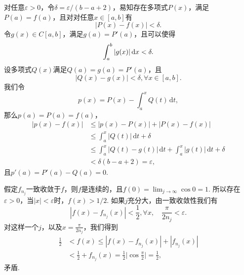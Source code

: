 \begin{ans}
  对任意$\varepsilon>0$，令$\delta=\varepsilon/(b-a+2)$，易知存在多项式$P(x)$，满足$P(a)=f(a)$，且对对任意$x\in[a,b]$有
  \[ |P(x)-f(x)|<\delta. \]
  令$g(x)\in C[a,b]$，满足$g(a)=P'(a)$，且可以使得
  \[ \int_a^b|g(x)|\,\mathrm dx<\delta. \]
  设多项式$Q(x)$满足$Q(a)=g(a)=P'(a)$，且
  \[ |Q(x)-g(x)|<\delta,\forall x\in[a,b]. \]
  我们令
  \[ p(x) = P(x) - \int_a^xQ(t)\,\mathrm dt, \]
  那么$p(a)=P(a)=f(a)$，
  \begin{align*}
    |p(x)-f(x)| & \le |p(x)-P(x)| + |P(x)-f(x)|\\
    & \le \int_a^x|Q(t)|\,\mathrm dt + \delta\\
    & \le \int_a^x|Q(t)-g(t)|\,\mathrm dt +
    \int_a^x|g(t)|\,\mathrm dt + \delta\\
    & < \delta(b-a+2) = \varepsilon,
  \end{align*}
  且$p'(a)=P'(a)-Q(a)=0$.
\end{ans}

\begin{ans}
  假定$f_{n_j}$一致收敛于$f$，则$f$是连续的，且$f(0)=\lim_{j\to\infty}\cos 0=1$. 所以存在$\varepsilon>0$，当$|x|<\varepsilon$时，$f(x)>1/2$. 如果$j$充分大，由一致收敛性我们有
  \[ |f(x)-f_{n_j}(x)|<\frac12,\forall x,\quad \frac\pi{2n_j}<\varepsilon. \]
  对这样一个$j$，以及$x=\frac\pi{2n_j}$，我们得到
  \begin{align*}
    \frac12 & < f(x) \le |f(x)-f_{n_j}(x)| + |f_{n_j}(x)|\\
    & < \frac12 + f_{n_j}(x) = \frac12\Big|\cos\frac\pi2\Big|=\frac12,
  \end{align*}
  矛盾.
\end{ans}

